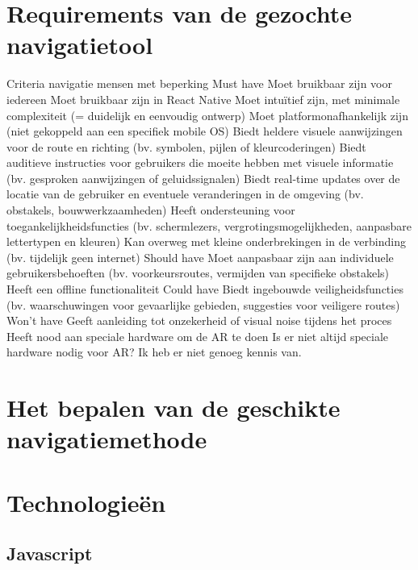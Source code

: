 \section{Requirements van de gezochte navigatietool}
\label{sec:requirements}

Criteria navigatie mensen met beperking
Must have
Moet bruikbaar zijn voor iedereen
Moet bruikbaar zijn in React Native
Moet intuïtief zijn, met minimale complexiteit (= duidelijk en eenvoudig ontwerp)
Moet platformonafhankelijk zijn (niet gekoppeld aan een specifiek mobile OS)
Biedt heldere visuele aanwijzingen voor de route en richting (bv. symbolen, pijlen of kleurcoderingen)
Biedt auditieve instructies voor gebruikers die moeite hebben met visuele informatie (bv. gesproken aanwijzingen of geluidssignalen)
Biedt real-time updates over de locatie van de gebruiker en eventuele veranderingen in de omgeving (bv. obstakels, bouwwerkzaamheden)
Heeft ondersteuning voor toegankelijkheidsfuncties (bv. schermlezers, vergrotingsmogelijkheden, aanpasbare lettertypen en kleuren)
Kan overweg met kleine onderbrekingen in de verbinding (bv. tijdelijk geen internet)
Should have
Moet aanpasbaar zijn aan individuele gebruikersbehoeften (bv. voorkeursroutes, vermijden van specifieke obstakels)
Heeft een offline functionaliteit
Could have
Biedt ingebouwde veiligheidsfuncties (bv. waarschuwingen voor gevaarlijke gebieden, suggesties voor veiligere routes)
Won't have
Geeft aanleiding tot onzekerheid of visual noise tijdens het proces
Heeft nood aan speciale hardware om de AR te doen
Is er niet altijd speciale hardware nodig voor AR? Ik heb er niet genoeg kennis van.


\section{Het bepalen van de geschikte navigatiemethode}
\label{sec:bepalen-geschikte-navigatiemethode}

\section{Technologieën}
\label{sec:technologieën}


\subsection{Javascript}
\label{sec:javascript}

